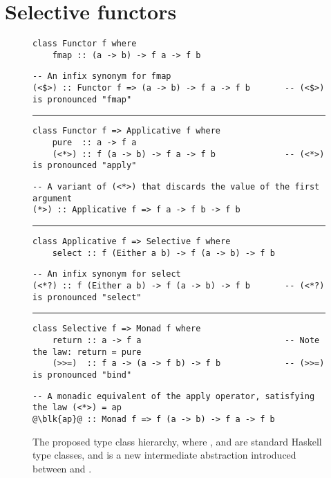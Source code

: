 \section{Selective functors}\label{sec-selective}

\begin{figure}
\begin{verbatim}
class Functor f where
    fmap :: (a -> b) -> f a -> f b
\end{verbatim}
\vspace{0.5mm}
\begin{verbatim}
-- An infix synonym for fmap
(<$>) :: Functor f => (a -> b) -> f a -> f b       -- (<$>) is pronounced "fmap"
\end{verbatim}
\vspace{2mm}
\hrule
\vspace{2mm}
\begin{verbatim}
class Functor f => Applicative f where
    pure  :: a -> f a
    (<*>) :: f (a -> b) -> f a -> f b              -- (<*>) is pronounced "apply"
\end{verbatim}
\vspace{0.5mm}
\begin{verbatim}
-- A variant of (<*>) that discards the value of the first argument
(*>) :: Applicative f => f a -> f b -> f b
\end{verbatim}
\vspace{2mm}
\hrule
\vspace{2mm}
\begin{verbatim}
class Applicative f => Selective f where
    select :: f (Either a b) -> f (a -> b) -> f b
\end{verbatim}
\vspace{0.5mm}
\begin{verbatim}
-- An infix synonym for select
(<*?) :: f (Either a b) -> f (a -> b) -> f b       -- (<*?) is pronounced "select"
\end{verbatim}
\vspace{2mm}
\hrule
\vspace{2mm}
\begin{verbatim}
class Selective f => Monad f where
    return :: a -> f a                             -- Note the law: return = pure
    (>>=)  :: f a -> (a -> f b) -> f b             -- (>>=) is pronounced "bind"
\end{verbatim}
\vspace{0.5mm}
\begin{verbatim}
-- A monadic equivalent of the apply operator, satisfying the law (<*>) = ap
@\blk{ap}@ :: Monad f => f (a -> b) -> f a -> f b
\end{verbatim}
\caption{The proposed type class hierarchy, where , 
and  are standard Haskell type classes, and  is
a new intermediate abstraction introduced between  and
.}\label{fig-types}
\vspace{-2mm}
\end{figure}

